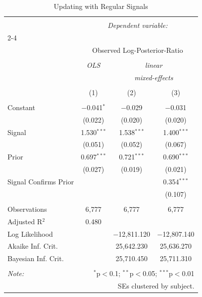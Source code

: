 
\begin{table}[!htbp] \centering 
  \caption{Updating with Regular Signals} 
  \label{} 
\begin{tabular}{@{\extracolsep{5pt}}lccc} 
\\[-1.8ex]\hline 
\hline \\[-1.8ex] 
 & \multicolumn{3}{c}{\textit{Dependent variable:}} \\ 
\cline{2-4} 
\\[-1.8ex] & \multicolumn{3}{c}{Observed Log-Posterior-Ratio} \\ 
\\[-1.8ex] & \textit{OLS} & \multicolumn{2}{c}{\textit{linear}} \\ 
 & \textit{} & \multicolumn{2}{c}{\textit{mixed-effects}} \\ 
\\[-1.8ex] & (1) & (2) & (3)\\ 
\hline \\[-1.8ex] 
 Constant & $-$0.041$^{*}$ & $-$0.029 & $-$0.031 \\ 
  & (0.022) & (0.020) & (0.020) \\ 
  Signal & 1.530$^{***}$ & 1.538$^{***}$ & 1.400$^{***}$ \\ 
  & (0.051) & (0.052) & (0.067) \\ 
  Prior & 0.697$^{***}$ & 0.721$^{***}$ & 0.690$^{***}$ \\ 
  & (0.027) & (0.019) & (0.021) \\ 
  Signal Confirms Prior &  &  & 0.354$^{***}$ \\ 
  &  &  & (0.107) \\ 
 \hline \\[-1.8ex] 
Observations & 6,777 & 6,777 & 6,777 \\ 
Adjusted R$^{2}$ & 0.480 &  &  \\ 
Log Likelihood &  & $-$12,811.120 & $-$12,807.140 \\ 
Akaike Inf. Crit. &  & 25,642.230 & 25,636.270 \\ 
Bayesian Inf. Crit. &  & 25,710.450 & 25,711.310 \\ 
\hline 
\hline \\[-1.8ex] 
\textit{Note:}  & \multicolumn{3}{r}{$^{*}$p$<$0.1; $^{**}$p$<$0.05; $^{***}$p$<$0.01} \\ 
 & \multicolumn{3}{r}{SEs clustered by subject.} \\ 
\end{tabular} 
\end{table} 

